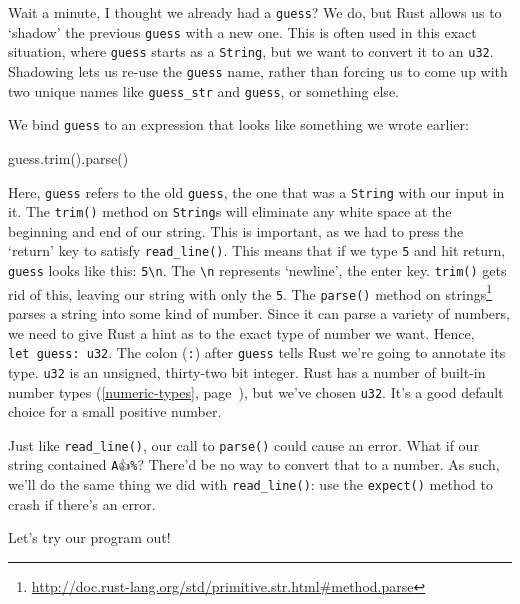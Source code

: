 \documentclass[a4paper,]{book}
\renewcommand*{\hyperref}[2][\ar]{%
  \def\ar{#2}%
  #2 (\autoref{#1}, page~\pageref{#1})}
\newenvironment{Shaded}{\begin{snugshade}}{\end{snugshade}}
\newcommand{\KeywordTok}[1]{\textcolor[rgb]{0.13,0.29,0.53}{\textbf{{#1}}}}
\newcommand{\NormalTok}[1]{{#1}}
\renewcommand{\href}[2]{#2\footnote{\url{#1}}}
\begin{document}
Wait a minute, I thought we already had a \texttt{guess}? We do, but
Rust allows us to `shadow' the previous \texttt{guess} with a new one.
This is often used in this exact situation, where \texttt{guess} starts
as a \texttt{String}, but we want to convert it to an \texttt{u32}.
Shadowing lets us re-use the \texttt{guess} name, rather than forcing us
to come up with two unique names like \texttt{guess\_str} and
\texttt{guess}, or something else.

We bind \texttt{guess} to an expression that looks like something we
wrote earlier:

\begin{Shaded}
\begin{Highlighting}[]
\NormalTok{guess.trim().parse()}
\end{Highlighting}
\end{Shaded}

Here, \texttt{guess} refers to the old \texttt{guess}, the one that was
a \texttt{String} with our input in it. The \texttt{trim()} method on
\texttt{String}s will eliminate any white space at the beginning and end
of our string. This is important, as we had to press the `return' key to
satisfy \texttt{read\_line()}. This means that if we type \texttt{5} and
hit return, \texttt{guess} looks like this: \texttt{5\textbackslash{}n}.
The \texttt{\textbackslash{}n} represents `newline', the enter key.
\texttt{trim()} gets rid of this, leaving our string with only the
\texttt{5}. The
\href{http://doc.rust-lang.org/std/primitive.str.html\#method.parse}{\texttt{parse()}
method on strings} parses a string into some kind of number. Since it
can parse a variety of numbers, we need to give Rust a hint as to the
exact type of number we want. Hence, \texttt{let\ guess:\ u32}. The
colon (\texttt{:}) after \texttt{guess} tells Rust we're going to
annotate its type. \texttt{u32} is an unsigned, thirty-two bit integer.
Rust has \hyperref[numeric-types]{a number of built-in number types},
but we've chosen \texttt{u32}. It's a good default choice for a small
positive number.

Just like \texttt{read\_line()}, our call to \texttt{parse()} could
cause an error. What if our string contained \texttt{A👍\%}? There'd be
no way to convert that to a number. As such, we'll do the same thing we
did with \texttt{read\_line()}: use the \texttt{expect()} method to
crash if there's an error.

Let's try our program out!

\begin{Shaded}
\end{Shaded}
\end{document}
